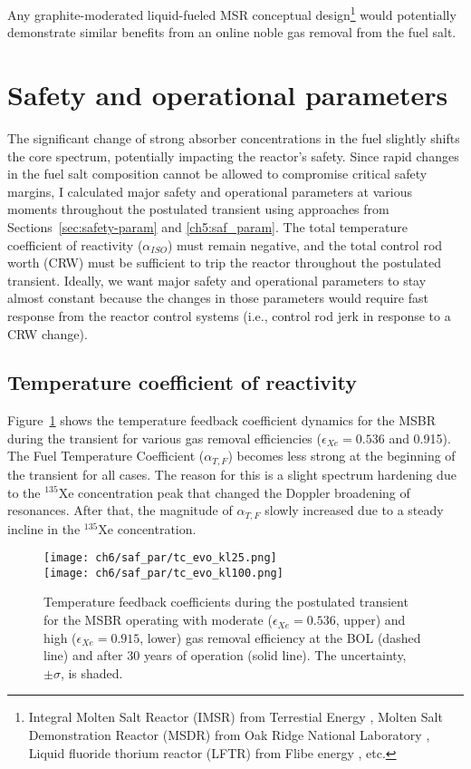 Any graphite-moderated liquid-fueled \gls{MSR} conceptual 
design\footnote{Integral Molten Salt Reactor (IMSR) from Terrestial Energy 
\cite{leblanc_integral_nodate}, Molten Salt Demonstration Reactor (MSDR) from 
Oak Ridge National Laboratory \cite{bettis_design_1972}, Liquid fluoride 
thorium reactor (LFTR) from Flibe energy \cite{sorensen_liquid-fluoride_2016}, 
etc.} would potentially demonstrate similar benefits from an online noble gas 
removal from the fuel salt.


\section{Safety and operational parameters}
The significant change of strong absorber concentrations in the fuel slightly 
shifts the core spectrum, potentially impacting the reactor's safety.
Since rapid changes in the fuel salt composition cannot be allowed to 
compromise critical safety margins,
I calculated major safety and operational parameters at various moments 
throughout the postulated transient using approaches from 
Sections~\ref{sec:safety-param} and \ref{ch5:saf_param}. 
The total temperature coefficient of reactivity ($\alpha_{ISO}$) must remain 
negative, and the total control rod worth (CRW) must be sufficient to trip the 
reactor throughout the postulated transient. Ideally, we want major safety 
and operational parameters to stay almost constant because the changes in 
those parameters would require fast response from the reactor control systems 
(i.e., control rod jerk in response to a CRW change).

\subsection{Temperature coefficient of reactivity}
Figure~\ref{fig:msbr-lf-tc-evo} shows the temperature feedback coefficient 
dynamics for the \gls{MSBR} during the transient for various gas removal 
efficiencies ($\epsilon_{Xe}=0.536$ and 0.915). 
The Fuel Temperature Coefficient ($\alpha_{T,F}$) becomes less strong at the 
beginning of the transient for all cases. The reason for this is a 
slight spectrum hardening due to the $^{135}$Xe concentration peak that 
changed the Doppler broadening of resonances. After that, the magnitude of 
$\alpha_{T,F}$ slowly increased due to a steady incline in the $^{135}$Xe 
concentration.
\begin{figure}[htbp!] %
	\centering
	\texttt{[image: ch6/saf\_par/tc\_evo\_kl25.png]}\\
	\vspace{-12mm}
	\hspace{+0.05mm}
	\texttt{[image: ch6/saf\_par/tc\_evo\_kl100.png]}
	\vspace{-3mm}
	\caption{Temperature feedback coefficients during the postulated transient 
	for the \gls{MSBR} operating with moderate ($\epsilon_{Xe}=0.536$, upper) 
	and high ($\epsilon_{Xe}=0.915$, lower) gas removal efficiency at the 
	\gls{BOL} (dashed line) and after 30 years of operation (solid line).
	The	uncertainty, $\pm\sigma$, is shaded.}
	\label{fig:msbr-lf-tc-evo}
\end{figure}

